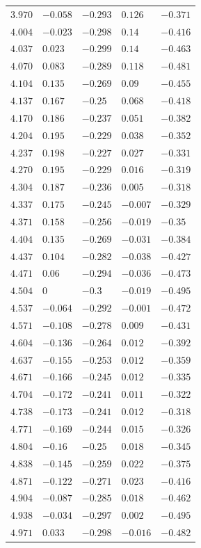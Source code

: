 \begin{table}[h]
\begin{tabular}{rllll}
$3.970$&$-0.058$&$-0.293$&$0.126$&$-0.371$\\
$4.004$&$-0.023$&$-0.298$&$0.14$&$-0.416$\\
$4.037$&$0.023$&$-0.299$&$0.14$&$-0.463$\\
$4.070$&$0.083$&$-0.289$&$0.118$&$-0.481$\\
$4.104$&$0.135$&$-0.269$&$0.09$&$-0.455$\\
$4.137$&$0.167$&$-0.25$&$0.068$&$-0.418$\\
$4.170$&$0.186$&$-0.237$&$0.051$&$-0.382$\\
$4.204$&$0.195$&$-0.229$&$0.038$&$-0.352$\\
$4.237$&$0.198$&$-0.227$&$0.027$&$-0.331$\\
$4.270$&$0.195$&$-0.229$&$0.016$&$-0.319$\\
$4.304$&$0.187$&$-0.236$&$0.005$&$-0.318$\\
$4.337$&$0.175$&$-0.245$&$-0.007$&$-0.329$\\
$4.371$&$0.158$&$-0.256$&$-0.019$&$-0.35$\\
$4.404$&$0.135$&$-0.269$&$-0.031$&$-0.384$\\
$4.437$&$0.104$&$-0.282$&$-0.038$&$-0.427$\\
$4.471$&$0.06$&$-0.294$&$-0.036$&$-0.473$\\
$4.504$&$0$&$-0.3$&$-0.019$&$-0.495$\\
$4.537$&$-0.064$&$-0.292$&$-0.001$&$-0.472$\\
$4.571$&$-0.108$&$-0.278$&$0.009$&$-0.431$\\
$4.604$&$-0.136$&$-0.264$&$0.012$&$-0.392$\\
$4.637$&$-0.155$&$-0.253$&$0.012$&$-0.359$\\
$4.671$&$-0.166$&$-0.245$&$0.012$&$-0.335$\\
$4.704$&$-0.172$&$-0.241$&$0.011$&$-0.322$\\
$4.738$&$-0.173$&$-0.241$&$0.012$&$-0.318$\\
$4.771$&$-0.169$&$-0.244$&$0.015$&$-0.326$\\
$4.804$&$-0.16$&$-0.25$&$0.018$&$-0.345$\\
$4.838$&$-0.145$&$-0.259$&$0.022$&$-0.375$\\
$4.871$&$-0.122$&$-0.271$&$0.023$&$-0.416$\\
$4.904$&$-0.087$&$-0.285$&$0.018$&$-0.462$\\
$4.938$&$-0.034$&$-0.297$&$0.002$&$-0.495$\\
$4.971$&$0.033$&$-0.298$&$-0.016$&$-0.482$\\

\end{tabular}
\end{table}

